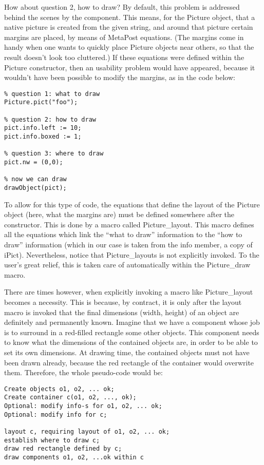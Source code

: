 \documentclass{article}
\newcommand{\code}{\ttfamily}
\begin{document}
How about question 2, how to draw? By default, this problem is addressed behind the
scenes by the component. This means, for the Picture object, that a native picture is created
from the given string, and around that picture certain margins are placed, by means of MetaPost equations.
(The margins come in handy when one wants to quickly place Picture objects near others,
so that the result doesn't look too cluttered.)
If these equations were defined within the Picture constructor, then an
usability problem would have appeared, because it wouldn't have been possible to modify the margins,
as in the code below:

\begin{verbatim}
% question 1: what to draw
Picture.pict("foo");

% question 2: how to draw
pict.info.left := 10;
pict.info.boxed := 1;

% question 3: where to draw
pict.nw = (0,0);

% now we can draw
drawObject(pict);
\end{verbatim}

To allow for this type of code, the equations that define the layout of the {\code Picture} object (here, what the margins are)
must be defined somewhere after the constructor. This is done by a macro called {\code Picture\_layout}.
This macro defines all the equations which link the ``what to draw'' information to the ``how to draw''
information (which in our case is taken from the {\code info} member, a copy of {\code iPict}).
Nevertheless, notice that {\code Picture\_layouts} is not explicitly invoked. To the user's
great relief, this is taken care of automatically within the {\code Picture\_draw} macro.

There are times however, when explicitly invoking a macro like {\code Picture\_layout}
becomes a necessity. This is because, by contract, it is only after the {\code layout}
macro is invoked that the final dimensions (width, height) of an object are
definitely and permanently known. Imagine that we have a component whose job is to
surround in a red-filled rectangle some other objects. This component
needs to know what the dimensions of the contained objects are, in order to be able to set
its own dimensions. At drawing time, the contained objects must not have been drawn already,
because the red rectangle of the container would overwrite them.
Therefore, the whole pseudo-code would be:
\begin{verbatim}
Create objects o1, o2, ... ok;
Create container c(o1, o2, ..., ok);
Optional: modify info-s for o1, o2, ... ok;
Optional: modify info for c;

layout c, requiring layout of o1, o2, ... ok;
establish where to draw c;
draw red rectangle defined by c;
draw components o1, o2, ...ok within c
\end{verbatim}
\end{document}
